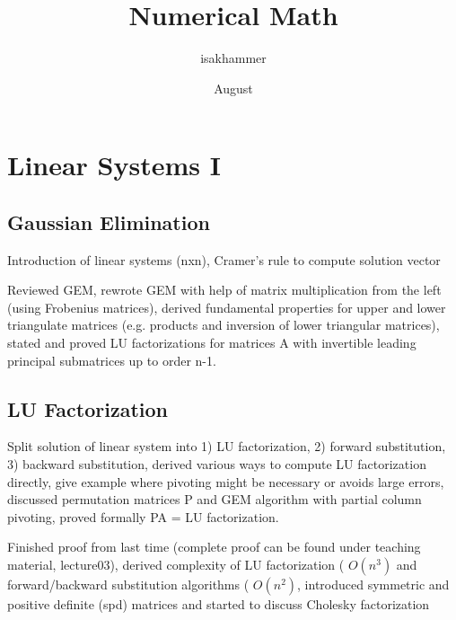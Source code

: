 \documentclass{article}
\title{Numerical Math}
\author{isakhammer }
\date{August}
\theoremstyle{remark}
\begin{document}
\maketitle
\tableofcontents
\newpage

\newpage
\section{Linear Systems I}%
\label{sec:linear_systems_i}

\subsection{Gaussian Elimination}%
\label{sub:gaussian_elimination}
\begin{tcolorbox}
  Introduction of linear systems (nxn), Cramer's rule to compute solution vector
\end{tcolorbox}
 \begin{tcolorbox}
   Reviewed GEM, rewrote GEM with help of matrix multiplication from the left (using Frobenius matrices), derived fundamental properties for upper and lower triangulate matrices (e.g. products and inversion of lower triangular matrices), stated and proved LU factorizations for matrices A with invertible leading principal submatrices up to order n-1.
 \end{tcolorbox}

\subsection{LU Factorization}%
\label{sub:lu_factorization}
\begin{tcolorbox}
  Split solution of linear system into 1) LU factorization, 2) forward substitution, 3) backward substitution, derived various ways to compute LU factorization directly, give example where pivoting might be necessary or avoids large errors,  discussed permutation matrices P and GEM algorithm with partial column pivoting, proved formally PA = LU factorization. 
\end{tcolorbox}

\begin{tcolorbox}
  Finished proof from last time (complete proof can be found under teaching material, lecture03), derived complexity of LU factorization ( $O(n^3)$  and forward/backward substitution algorithms ( $O(n^2)$, introduced symmetric and positive definite (spd) matrices and started to discuss Cholesky factorization	
\end{tcolorbox}
\end{document}
